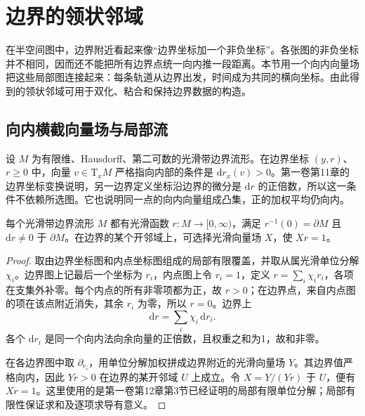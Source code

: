 
% 
% 

\section{边界的领状邻域}
\label{g2:sec:1504}

在半空间图中，边界附近看起来像“边界坐标加一个非负坐标”。各张图的非负坐标并不相同，因而还不能把所有边界点统一向内推一段距离。本节用一个向内向量场把这些局部图连接起来：每条轨道从边界出发，时间成为共同的横向坐标。由此得到的领状邻域可用于双化、粘合和保持边界数据的构造。

\subsection{向内横截向量场与局部流}
\label{g2:subsec:1504:01}

设 \(M\) 为有限维、Hausdorff、第二可数的光滑带边界流形。在边界坐标 \((y,r)\)、\(r\ge0\) 中，向量 \(v\in\mathrm{T}_xM\) 严格指向内部的条件是 \(\mathrm{d}r_x(v)>0\)。第一卷第11章的边界坐标变换说明，另一边界定义坐标沿边界的微分是 \(\mathrm{d}r\) 的正倍数，所以这一条件不依赖所选图。它也说明同一点的向内向量组成凸集，正的加权平均仍向内。

\begin{lemma}\label{g2:lem:boundary-defining-function}
	每个光滑带边界流形 \(M\) 都有光滑函数 \(r:M\to[0,\infty)\)，满足 \(r^{-1}(0)=\partial M\) 且 \(\mathrm{d}r\ne0\) 于 \(\partial M\)。在边界的某个开邻域上，可选择光滑向量场 \(X\)，使 \(Xr=1\)。
\end{lemma}
\begin{proof}
	取由边界坐标图和内点坐标图组成的局部有限覆盖，并取从属光滑单位分解 \(\chi_i\)。边界图上记最后一个坐标为 \(r_i\)，内点图上令 \(r_i=1\)，定义 \(r=\sum_i\chi_i r_i\)，各项在支集外补零。每个内点的所有非零项都为正，故 \(r>0\)；在边界点，来自内点图的项在该点附近消失，其余 \(r_i\) 为零，所以 \(r=0\)。边界上
	\[
		\mathrm{d}r=\sum_i\chi_i\,\mathrm{d}r_i.
	\]
	各个 \(\mathrm{d}r_i\) 是同一个向内法向余向量的正倍数，且权重之和为1，故和非零。

	在各边界图中取 \(\partial_{r_i}\)，用单位分解加权拼成边界附近的光滑向量场 \(Y\)。其边界值严格向内，因此 \(Yr>0\) 在边界的某开邻域 \(U\) 上成立。令 \(X=Y/(Yr)\) 于 \(U\)，便有 \(Xr=1\)。这里使用的是第一卷第12章第3节已经证明的局部有限单位分解；局部有限性保证求和及逐项求导有意义。
\end{proof}

